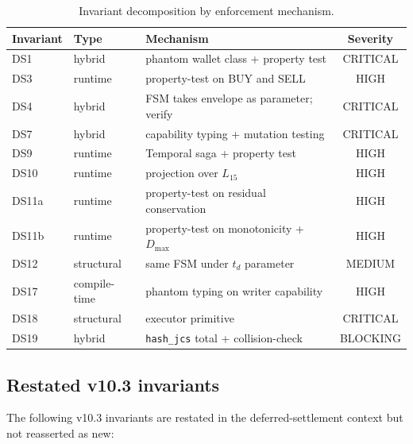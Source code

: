 \documentclass[11pt,a4paper]{article}
\begin{document}
\begin{table}[h]
\centering
\begin{tabular}{lllc}
\toprule
\textbf{Invariant} & \textbf{Type} & \textbf{Mechanism} & \textbf{Severity} \\
\midrule
DS1     & hybrid       & phantom wallet class + property test & CRITICAL \\
DS3     & runtime      & property-test on BUY and SELL         & HIGH \\
DS4     & hybrid       & FSM takes envelope as parameter; verify & CRITICAL \\
DS7     & hybrid       & capability typing + mutation testing  & CRITICAL \\
DS9     & runtime      & Temporal saga + property test         & HIGH \\
DS10    & runtime      & projection over $L_{15}$              & HIGH \\
DS11a   & runtime      & property-test on residual conservation & HIGH \\
DS11b   & runtime      & property-test on monotonicity + $D_{\max}$ & HIGH \\
DS12    & structural   & same FSM under $t_d$ parameter        & MEDIUM \\
DS17    & compile-time & phantom typing on writer capability   & HIGH \\
DS18    & structural   & executor primitive                    & CRITICAL \\
DS19    & hybrid       & \texttt{hash\_jcs} total + collision-check & BLOCKING \\
\bottomrule
\end{tabular}
\caption{Invariant decomposition by enforcement mechanism.}
\end{table}

\subsection*{Restated v10.3 invariants}

The following v10.3 invariants are restated in the deferred-settlement context but not reasserted as new:
\end{document}
